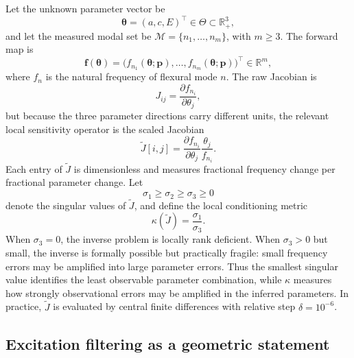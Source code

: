 Let the unknown parameter vector be
\begin{equation}
  \boldsymbol{\theta} = (a,c,E)^\top \in \Theta \subset \mathbb{R}^3_{+},
\end{equation}
and let the measured modal set be $\mathcal{M}=\{n_1,\ldots,n_m\}$, with
$m \geq 3$.  The forward map is
\begin{equation}
  \mathbf{f}(\boldsymbol{\theta})
  =
  \bigl(
    f_{n_1}(\boldsymbol{\theta};\mathbf{p}),
    \ldots,
    f_{n_m}(\boldsymbol{\theta};\mathbf{p})
  \bigr)^\top \in \mathbb{R}^m,
  \label{eq:p10_forward_map}
\end{equation}
where $f_n$ is the natural frequency of flexural mode $n$.  The raw Jacobian is
\begin{equation}
  J_{ij}
  =
  \frac{\partial f_{n_i}}{\partial \theta_j},
  \label{eq:p10_raw_jacobian}
\end{equation}
but because the three parameter directions carry different units, the relevant
local sensitivity operator is the scaled Jacobian
\begin{equation}
  \widetilde{J}[i,j]
  =
  \frac{\partial f_{n_i}}{\partial \theta_j}
  \frac{\theta_j}{f_{n_i}}.
  \label{eq:p10_scaled_jacobian}
\end{equation}
Each entry of $\widetilde{J}$ is dimensionless and measures fractional
frequency change per fractional parameter change.  Let
\begin{equation}
  \sigma_1 \geq \sigma_2 \geq \sigma_3 \geq 0
  \label{eq:p10_singular_values}
\end{equation}
denote the singular values of $\widetilde{J}$, and define the local
conditioning metric
\begin{equation}
  \kappa(\widetilde{J}) = \frac{\sigma_1}{\sigma_3}.
  \label{eq:p10_condition_number}
\end{equation}
When $\sigma_3=0$, the inverse problem is locally rank deficient.  When
$\sigma_3>0$ but small, the inverse is formally possible but practically
fragile: small frequency errors may be amplified into large parameter errors.
Thus the smallest singular value identifies the least observable parameter
combination, while $\kappa$ measures how strongly observational errors may be
amplified in the inferred parameters.  In practice, $\widetilde{J}$ is
evaluated by central finite differences with relative step $\delta=10^{-6}$.

\subsection{Excitation filtering as a geometric statement}


